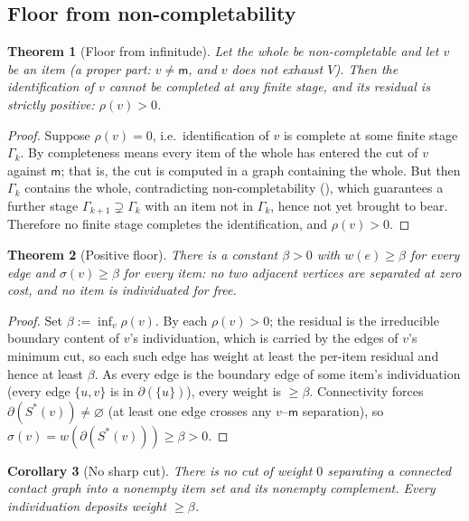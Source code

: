 \documentclass[11pt,a4paper]{article}
\theoremstyle{thmstyle}
\newtheorem{theorem}{Theorem}[section]
\newtheorem{corollary}[theorem]{Corollary}
\theoremstyle{definition}
\theoremstyle{remark}
\newcommand{\Gph}{\Gamma}
\newcommand{\V}{V}
\newcommand{\wt}{w}
\newcommand{\med}{\mathsf{m}}            %
\newcommand{\flo}{\beta}                 %
\newcommand{\cut}{\partial}              %
\newcommand{\res}{\rho}                  %
\newcommand{\str}{\sigma}                %
\begin{document}
\subsection{Floor from non-completability}

\begin{theorem}[Floor from infinitude]
\label{thm:floor-derived}
Let the whole be non-completable and let $v$ be an item (a proper part:
$v\neq\med$, and $v$ does not exhaust $\V$). Then the identification of $v$
cannot be completed at any finite stage, and its residual is strictly
positive: $\res(v)>0$.
\end{theorem}

\begin{proof}
Suppose $\res(v)=0$, i.e.\ identification of $v$ is complete at some
finite stage $\Gph_k$. By  completeness means
every item of the whole has entered the cut of $v$ against $\med$; that
is, the cut is computed in a graph containing the whole. But then
$\Gph_k$ contains the whole, contradicting non-completability
(), which guarantees a further stage
$\Gph_{k+1}\supsetneq\Gph_k$ with an item not in $\Gph_k$, hence not yet
brought to bear. Therefore no finite stage completes the identification,
and $\res(v)>0$.
\end{proof}

\begin{theorem}[Positive floor]
\label{thm:floor}
There is a constant $\flo>0$ with $\wt(e)\ge\flo$ for every edge and
$\str(v)\ge\flo$ for every item: no two adjacent vertices are separated at
zero cost, and no item is individuated for free.
\end{theorem}

\begin{proof}
Set $\flo:=\inf_v\res(v)$. By  each $\res(v)>0$;
the residual is the irreducible boundary content of $v$'s individuation,
which is carried by the edges of $v$'s minimum cut, so each such edge has
weight at least the per-item residual and hence at least $\flo$. As every
edge is the boundary edge of some item's individuation (every edge
$\{u,v\}$ is in $\cut(\{u\})$), every weight is $\ge\flo$. Connectivity
forces $\cut(S^{\ast}(v))\neq\varnothing$ (at least one edge crosses any
$v$--$\med$ separation), so
$\str(v)=\wt(\cut(S^{\ast}(v)))\ge\flo>0$.
\end{proof}

\begin{corollary}[No sharp cut]
\label{cor:no-sharp}
There is no cut of weight $0$ separating a connected contact graph into a
nonempty item set and its nonempty complement. Every individuation
deposits weight $\ge\flo$.
\end{corollary}
\end{document}
